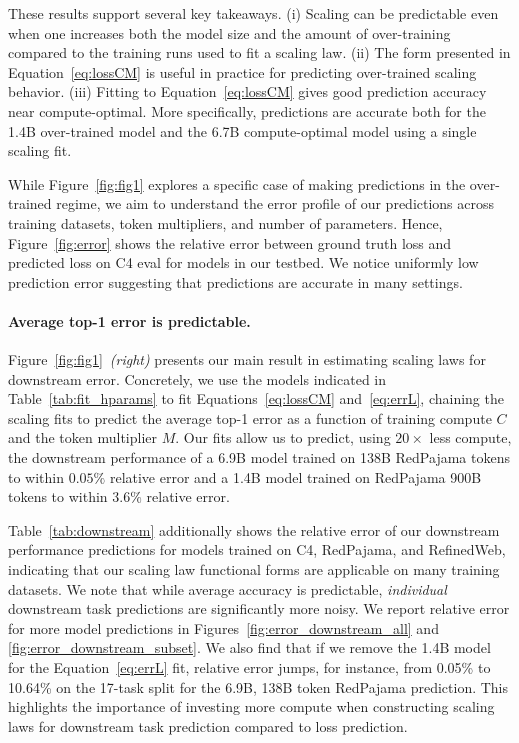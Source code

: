 These results support several key takeaways.
(i) Scaling can be predictable even when one increases both the model size and the amount of over-training compared to the training runs used to fit a scaling law.
(ii) The form presented in Equation~\eqref{eq:lossCM} is useful in practice for predicting over-trained scaling behavior.
(iii) Fitting to Equation~\eqref{eq:lossCM} gives good prediction accuracy near compute-optimal.
More specifically, predictions are accurate both for the 1.4B over-trained model and the 6.7B compute-optimal model using a single scaling fit.

While Figure~\ref{fig:fig1} explores a specific case of making predictions in the over-trained regime, we aim to understand the error profile of our predictions across training datasets, token multipliers, and number of parameters.
Hence, Figure~\ref{fig:error} shows the relative error between ground truth loss and predicted loss on C4 eval for models in our testbed.
We notice uniformly low prediction error suggesting that predictions are accurate in many settings.

\paragraph{Average top-1 error is predictable.}
Figure~\ref{fig:fig1}~\emph{(right)} presents our main result in estimating scaling laws for downstream error.
Concretely, we use the models indicated in Table~\ref{tab:fit_hparams} to fit Equations~\eqref{eq:lossCM} and~\eqref{eq:errL}, chaining the scaling fits to predict the average top-1 error as a function of training compute $C$ and the token multiplier $M$.
Our fits allow us to predict, using $20\times$ less compute, the downstream performance of a 6.9B model trained on 138B RedPajama tokens to within $0.05\%$ relative error and a 1.4B model trained on RedPajama 900B tokens to within $3.6\%$ relative error.

Table~\ref{tab:downstream} additionally shows the relative error of our downstream performance predictions for models trained on C4, RedPajama, and RefinedWeb, indicating that our scaling law functional forms are applicable on many training datasets.
We note that while average accuracy is predictable, \textit{individual} downstream task predictions are significantly more noisy.
We report relative error for more model predictions in Figures~\ref{fig:error_downstream_all} and \ref{fig:error_downstream_subset}.
We also find that if we remove the 1.4B model for the Equation~\eqref{eq:errL} fit, relative error jumps, for instance, from 0.05\% to 10.64\% on the 17-task split for the 6.9B, 138B token RedPajama prediction.
This highlights the importance of investing more compute when constructing scaling laws for downstream task prediction compared to loss prediction.

